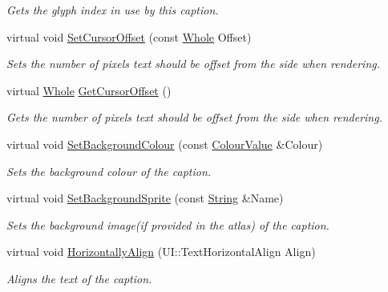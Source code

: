 \begin{DoxyCompactItemize}
\begin{DoxyCompactList}\small\item\em Gets the glyph index in use by this caption. \item\end{DoxyCompactList}\item 
virtual void \hyperlink{classphys_1_1UI_1_1Caption_a55c748adf8f23689c71c38fab284b567}{SetCursorOffset} (const \hyperlink{namespacephys_a460f6bc24c8dd347b05e0366ae34f34a}{Whole} Offset)
\begin{DoxyCompactList}\small\item\em Sets the number of pixels text should be offset from the side when rendering. \item\end{DoxyCompactList}\item 
virtual \hyperlink{namespacephys_a460f6bc24c8dd347b05e0366ae34f34a}{Whole} \hyperlink{classphys_1_1UI_1_1Caption_a381133922b882500ae0bf503acb4c6a4}{GetCursorOffset} ()
\begin{DoxyCompactList}\small\item\em Gets the number of pixels text should be offset from the side when rendering. \item\end{DoxyCompactList}\item 
virtual void \hyperlink{classphys_1_1UI_1_1Caption_a33ec6c09671474529b0f33f0f1cd51ad}{SetBackgroundColour} (const \hyperlink{classphys_1_1ColourValue}{ColourValue} \&Colour)
\begin{DoxyCompactList}\small\item\em Sets the background colour of the caption. \item\end{DoxyCompactList}\item 
virtual void \hyperlink{classphys_1_1UI_1_1Caption_a98422dc633dfb68ea87d0f54fda25f48}{SetBackgroundSprite} (const \hyperlink{namespacephys_aa03900411993de7fbfec4789bc1d392e}{String} \&Name)
\begin{DoxyCompactList}\small\item\em Sets the background image(if provided in the atlas) of the caption. \item\end{DoxyCompactList}\item 
virtual void \hyperlink{classphys_1_1UI_1_1Caption_a1b7d2736ee545f518c33f0cd99a4ef0a}{HorizontallyAlign} (UI::TextHorizontalAlign Align)
\begin{DoxyCompactList}\small\item\em Aligns the text of the caption. \item\end{DoxyCompactList}\item 

\end{DoxyCompactItemize}
